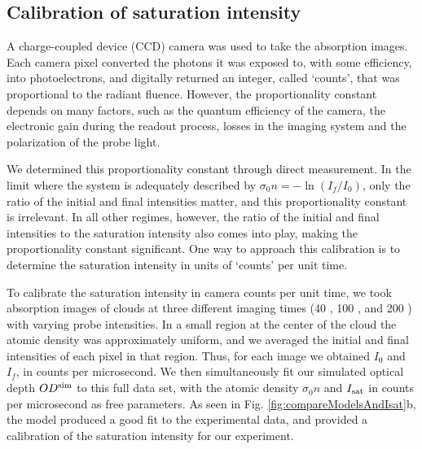\documentclass[12pt]{iopart}
\begin{document}
\subsection{Calibration of saturation intensity}
A charge-coupled device (CCD) camera was used to take the absorption images.  Each camera pixel  converted the photons it was exposed to, with some efficiency, into photoelectrons, and digitally returned an integer, called `counts', that was proportional to the radiant fluence.  However, the proportionality constant depends on many factors, such as the quantum efficiency of the camera, the electronic gain during the readout process, losses in the imaging system and the polarization of the probe light. 
\par We determined this proportionality constant through direct measurement. In the limit where the system is adequately described by $\sigma_0 n=-\ln(I_f/I_0)$, only the ratio of the initial and final intensities matter, and this proportionality constant is irrelevant. In all other regimes, however, the ratio of the initial and final intensities to the saturation intensity also comes into play, making the proportionality constant significant. One way to approach this calibration is to determine the saturation intensity in units of `counts' per unit time. 
\par To calibrate the saturation intensity in camera counts per unit time, we took absorption images of \K{} clouds at three different imaging times (40 \us{}, 100 \us{}, and 200 \us{}) with varying probe intensities. In a small region at the center of the cloud the atomic density was approximately uniform, and we averaged the initial and final intensities of each pixel in that region. Thus, for each image we obtained $I_0$ and $I_f$, in counts per microsecond. We then simultaneously fit our simulated optical depth  $OD^{\rm{sim}}$ to this full data set, with the atomic density $\sigma_0 n$ and  $I_{\rm{sat}}$ in counts per microsecond as free parameters. As seen in Fig. \ref{fig:compareModelsAndIsat}b, the model produced a good fit to the experimental data, and provided a calibration of the saturation intensity for our experiment. 
\end{document}
